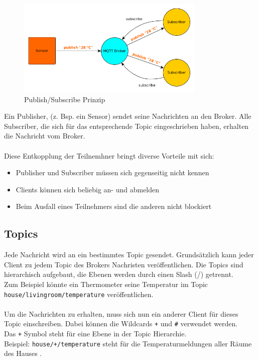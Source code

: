 \begin{figure}[H]
	\centering
		\includegraphics[width=0.8\textwidth]{bilder/pub_sub.png}
	\caption{\label{fig:pub_sub}Publish/Subscribe Prinzip}
\end{figure}


\par
Ein Publisher, (z. Bsp. ein Sensor) sendet seine Nachrichten an den Broker. Alle Subscriber, die sich für das entsprechende Topic eingeschrieben haben, erhalten die Nachricht vom Broker. 
\\ \\
Diese Entkopplung der Teilnemhner bringt diverse Vorteile mit sich:

\begin{itemize}
\item Publisher und Subscriber müssen sich gegenseitig nicht kennen
\item Clients können sich beliebig an- und abmelden
\item Beim Ausfall eines Teilnehmers sind die anderen nicht blockiert
\end{itemize}

\subsection{Topics}
Jede Nachricht wird an ein bestimmtes Topic gesendet. Grundsätzlich kann jeder Client zu jedem Topic des Brokers Nachristen veröffentlichen. Die Topics sind hierarchisch aufgebaut, die Ebenen werden durch einen Slash (/) getrennt.\\
Zum Beispiel könnte ein Thermometer seine Temperatur im Topic \texttt{house/livingroom/temperature} veröffentlichen.\\ \\
Um die Nachrichten zu erhalten, muss sich nun ein anderer Client für dieses Topic einschreiben. Dabei können die Wildcards \texttt{+} und \texttt{\#} verwendet werden.\\
Das \texttt{+} Symbol steht für eine Ebene in der Topic Hierarchie.\\
Beispiel: \texttt{house/+/temperature} steht für die Temperaturmeldungen aller Räume des Hauses .

